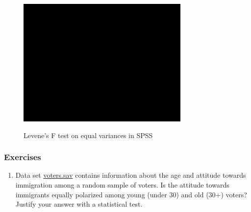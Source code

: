\documentclass[a4paper]{book}
\providecommand{\tightlist}{%
  \setlength{\itemsep}{0pt}\setlength{\parskip}{0pt}}
\theoremstyle{definition}
\theoremstyle{definition}
\theoremstyle{definition}
\theoremstyle{remark}
\begin{document}
\begin{figure}[H]
\href{https://www.youtube.com/embed/8k-OIXiRdCc}{\includegraphics[width=320px]{GentleIntro_files/figure-latex/SPSSLevene-1} }\caption{Levene's F test on equal variances in SPSS}\label{fig:SPSSLevene}
\end{figure}

\subsubsection*{Exercises}\label{exercises-12}

\begin{enumerate}
\def\labelenumi{\arabic{enumi}.}
\tightlist
\item
  Data set \href{http://82.196.4.233:3838/data/voters.sav}{voters.sav}
  contains information about the age and attitude towards immigration
  among a random sample of voters. Is the attitude towards immigrants
  equally polarized among young (under 30) and old (30+) voters? Justify
  your answer with a statistical test.
\end{enumerate}
\end{document}
